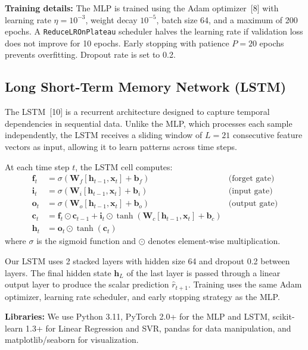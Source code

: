 \documentclass{article}
\begin{document}
\textbf{Training details:} The MLP is trained using the Adam optimizer~[8] with learning rate $\eta = 10^{-3}$, weight decay $10^{-5}$, batch size 64, and a maximum of 200 epochs. A \texttt{ReduceLROnPlateau} scheduler halves the learning rate if validation loss does not improve for 10 epochs. Early stopping with patience $P = 20$ epochs prevents overfitting. Dropout rate is set to 0.2.

\subsection{Long Short-Term Memory Network (LSTM)}

The LSTM~[10] is a recurrent architecture designed to capture temporal dependencies in sequential data. Unlike the MLP, which processes each sample independently, the LSTM receives a sliding window of $L = 21$ consecutive feature vectors as input, allowing it to learn patterns across time steps.

At each time step $t$, the LSTM cell computes:
\begin{align}
  \mathbf{f}_t &= \sigma(\mathbf{W}_f [\mathbf{h}_{t-1}, \mathbf{x}_t] + \mathbf{b}_f) & \text{(forget gate)} \\
  \mathbf{i}_t &= \sigma(\mathbf{W}_i [\mathbf{h}_{t-1}, \mathbf{x}_t] + \mathbf{b}_i) & \text{(input gate)} \\
  \mathbf{o}_t &= \sigma(\mathbf{W}_o [\mathbf{h}_{t-1}, \mathbf{x}_t] + \mathbf{b}_o) & \text{(output gate)} \\
  \mathbf{c}_t &= \mathbf{f}_t \odot \mathbf{c}_{t-1} + \mathbf{i}_t \odot \tanh(\mathbf{W}_c [\mathbf{h}_{t-1}, \mathbf{x}_t] + \mathbf{b}_c) \\
  \mathbf{h}_t &= \mathbf{o}_t \odot \tanh(\mathbf{c}_t)
\end{align}
where $\sigma$ is the sigmoid function and $\odot$ denotes element-wise multiplication.

Our LSTM uses 2 stacked layers with hidden size 64 and dropout 0.2 between layers. The final hidden state $\mathbf{h}_L$ of the last layer is passed through a linear output layer to produce the scalar prediction $\hat{r}_{t+1}$. Training uses the same Adam optimizer, learning rate scheduler, and early stopping strategy as the MLP.

\textbf{Libraries:} We use Python 3.11, PyTorch 2.0+ for the MLP and LSTM, scikit-learn 1.3+ for Linear Regression and SVR, pandas for data manipulation, and matplotlib/seaborn for visualization.
\end{document}
